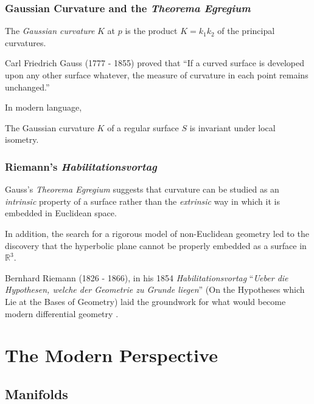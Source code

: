 \documentclass{beamer}
\newcommand{\R}{\mathbb{R}}
\theoremstyle{definition}
\begin{document}
\begin{frame}
    \frametitle{Gaussian Curvature and the \emph{Theorema Egregium}}

    \begin{definition}
        The \emph{Gaussian curvature} $K$ at $p$ is the product $K = k_1k_2$
        of the principal curvatures.
    \end{definition}

    Carl Friedrich Gauss (1777 - 1855) proved that ``If a curved surface is developed
    upon any other surface whatever, the measure of curvature in each point remains unchanged.''

    In modern language,
    \begin{theorem}
        The Gaussian curvature $K$ of a regular surface $S$ is invariant under
        local isometry.
    \end{theorem}

\end{frame}

\begin{frame}
    \frametitle{Riemann's \textit{Habilitationsvortag}}

    Gauss's \emph{Theorema Egregium} suggests that curvature can
    be studied as an \emph{intrinsic} property of a surface rather than
    the \emph{extrinsic} way in which it is embedded in Euclidean space.

    In addition, the search for a rigorous model of non-Euclidean geometry
    led to the discovery that the hyperbolic plane cannot be properly embedded
    as a surface in $\R^3$.

    Bernhard Riemann (1826 - 1866), in his 1854 \emph{Habilitationsvortag}
    ``\emph{Ueber die Hypothesen, welche der Geometrie zu Grunde liegen}''
    (On the Hypotheses which Lie at the Bases of Geometry) laid the groundwork
    for what would become modern differential geometry \cite{geom-diff-view,riemann}.

\end{frame}

\section{The Modern Perspective}

\subsection{Manifolds}
\end{document}
